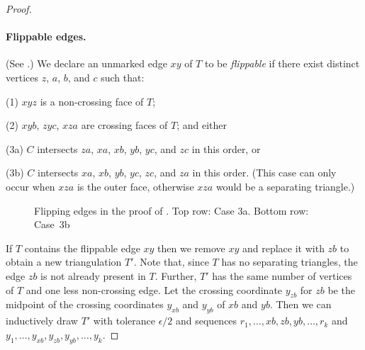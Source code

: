 \begin{proof}
	
\paragraph{Flippable edges.}
	(See .)
	We declare an unmarked edge $xy$ of $T$ to be \emph{flippable} if there
	exist distinct vertices $z$, $a$, $b$, and $c$ such that:
\begin{compactenum}[(11) ]
\item [(1)]
  $xyz$ is a non-crossing face of $T$;
\item [(2)]
  $xyb$, $zyc$, $xza$ are crossing faces of $T$;
  and either 
\item [(3a)] $C$
        intersects $za$, $xa$, $xb$, $yb$, $yc$, and $zc$ in this
        order, or
      \item [(3b)] $C$ intersects $xa$, $xb$, $yb$, $yc$, $zc$,
        and $za$ in this order. (This case can only occur when
        $xza$ is the outer face, otherwise $xza$ would be a separating
        triangle.)
        \end{compactenum}

        
	\begin{figure}[htb]
		\caption{Flipping edges in the proof of
			. Top row: Case 3a. Bottom row:
                        Case~3b}
	\end{figure}
	
	If $T$ contains the flippable edge $xy$ then we remove $xy$ and replace it with $zb$ to obtain a new triangulation $T'$. Note that, since $T$ has no separating triangles, the edge $zb$ is not already present in $T$. Further, $T'$ has the same number of vertices of $T$ and one less non-crossing edge. Let the crossing coordinate $y_{zb}$ for $zb$ be the midpoint of the crossing coordinates $y_{xb}$ and $y_{yb}$ of $xb$ and $yb$.  Then we can inductively draw $T'$ with tolerance $\epsilon/2$ and sequences $r_1,\dots,xb,zb,yb,\dots,r_k$ and $y_1,\dots,y_{xb},y_{zb},y_{yb},\dots,y_k$.
	

\end{proof}

